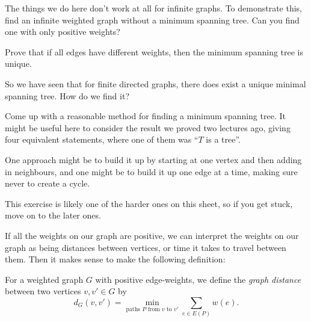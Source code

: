 \documentclass[nobib]{tufte-handout}
\begin{document}
\begin{xca}
    The things we do here don't work at all for infinite graphs. To demonstrate this, find an infinite weighted graph without a minimum spanning tree. Can you find one with only positive weights?
\end{xca}

\begin{xca}
    Prove that if all edges have different weights, then the minimum spanning tree is unique.
\end{xca}

So we have seen that for finite directed graphs, there does exist a unique minimal spanning tree. How do we find it?

\begin{xca}
  Come up with a reasonable method for finding a minimum spanning tree. It might be useful here to consider the result we proved two lectures ago, giving four equivalent statements, where one of them was ``$T$ is a tree''.

  One approach might be to build it up by starting at one vertex and then adding in neighbours, and one might be to build it up one edge at a time, making sure never to create a cycle.

  This exercise is likely one of the harder ones on this sheet, so if you get stuck, move on to the later ones.
\end{xca}

If all the weights on our graph are positive, we can interpret the weights on our graph as being distances between vertices, or time it takes to travel between them. Then it makes sense to make the following definition:

\begin{definition}
  For a weighted graph $G$ with positive edge-weights, we define the \emph{graph distance} between two vertices $v, v' \in G$ by
  $$d_G(v, v') = \min_{\text{paths }P\text{ from }v\text{ to }v'} \sum_{e \in E(P)} w(e).$$
\end{definition}
\end{document}
